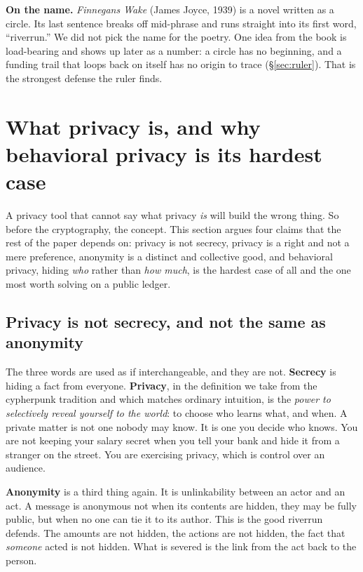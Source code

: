 \documentclass[11pt]{article}
\begin{document}
\begin{intuition}
\textbf{On the name.} \emph{Finnegans Wake} (James Joyce, 1939) is a novel written as a
circle. Its last sentence breaks off mid-phrase and runs straight into its first word,
``riverrun.'' We did not pick the name for the poetry. One idea from the book is
load-bearing and shows up later as a number: a circle has no beginning, and a funding
trail that loops back on itself has no origin to trace (\S\ref{sec:ruler}). That is the
strongest defense the ruler finds.
\end{intuition}

\section{What privacy is, and why behavioral privacy is its hardest case}
\label{sec:philosophy}

A privacy tool that cannot say what privacy \emph{is} will build the wrong thing. So
before the cryptography, the concept. This section argues four claims that the rest of
the paper depends on: privacy is not secrecy, privacy is a right and not a mere
preference, anonymity is a distinct and collective good, and behavioral privacy, hiding
\emph{who} rather than \emph{how much}, is the hardest case of all and the one most
worth solving on a public ledger.

\subsection{Privacy is not secrecy, and not the same as anonymity}

The three words are used as if interchangeable, and they are not. \textbf{Secrecy} is
hiding a fact from everyone. \textbf{Privacy}, in the definition we take from the
cypherpunk tradition and which matches ordinary intuition, is the \emph{power to
selectively reveal yourself to the world}: to choose who learns what, and when. A
private matter is not one nobody may know. It is one you decide who knows. You are not
keeping your salary secret when you tell your bank and hide it from a stranger on the
street. You are exercising privacy, which is control over an audience.

\textbf{Anonymity} is a third thing again. It is unlinkability between an actor and an
act. A message is anonymous not when its contents are hidden, they may be fully public,
but when no one can tie it to its author. This is the good riverrun defends. The amounts
are not hidden, the actions are not hidden, the fact that \emph{someone} acted is not
hidden. What is severed is the link from the act back to the person.
\end{document}
